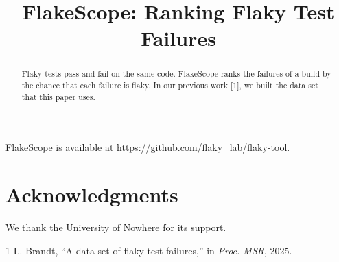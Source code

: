 \documentclass[conference]{IEEEtran}
\begin{document}
\title{FlakeScope: Ranking Flaky Test Failures}
\author{}
\maketitle
\begin{abstract}
Flaky tests pass and fail on the same code. FlakeScope ranks the failures of a build by the chance that each
failure is flaky. In our previous work [1], we built the data set that this paper uses.
\end{abstract}

FlakeScope is available at \url{https://github.com/flaky_lab/flaky-tool}.
\section*{Acknowledgments}
We thank the University of Nowhere for its support.
\begin{thebibliography}{1}
 L. Brandt, ``A data set of flaky test failures,'' in \emph{Proc. MSR}, 2025.
\end{thebibliography}
\end{document}
